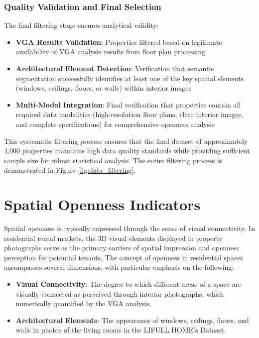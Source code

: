 \subsubsection{Quality Validation and Final Selection}

The final filtering stage ensures analytical validity:

\begin{itemize}
    \item \textbf{VGA Results Validation}: Properties filtered based on legitimate availability of VGA analysis results from floor plan processing
    \item \textbf{Architectural Element Detection}: Verification that semantic segmentation successfully identifies at least one of the key spatial elements (windows, ceilings, floors, or walls) within interior images
    \item \textbf{Multi-Modal Integration}: Final verification that properties contain all required data modalities (high-resolution floor plans, clear interior images, and complete specifications) for comprehensive openness analysis
\end{itemize}

This systematic filtering process ensures that the final dataset of approximately 4,000 properties maintains high data quality standards while providing sufficient sample size for robust statistical analysis.
The entire filtering process is demonstrated in Figure \ref{fig:data_filtering}.

\section{Spatial Openness Indicators}

Spatial openness is typically expressed through the sense of visual connectivity. 
In residential rental markets, the 3D visual elements displayed in property photographs serve as 
the primary carriers of spatial impression and openness perception for potential tenants. 
The concept of openness in residential spaces encompasses several dimensions, 
with particular emphasis on the following:

\begin{itemize}
    \item \textbf{Visual Connectivity}: The degree to which different areas of a space are visually 
    connected as perceived through interior photographs, which numerically quantified by the VGA analysis.
    
    \item \textbf{Architectural Elements}: The appearance of windows, ceilings, floors, and walls in photos of the living rooms in the LIFULL HOME's Dataset.
    
\end{itemize}

